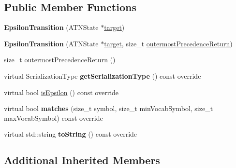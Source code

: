 \subsection*{Public Member Functions}
\begin{DoxyCompactItemize}
\item 
\mbox{\label{classantlr4_1_1atn_1_1EpsilonTransition_af9acaefc6f86484a05ffe9f6ffc38ae9}} 
{\bfseries Epsilon\+Transition} (A\+T\+N\+State $\ast$\hyperlink{classantlr4_1_1atn_1_1Transition_aaaed7f4ddda71e156b36de33e88f66a7}{target})
\item 
\mbox{\label{classantlr4_1_1atn_1_1EpsilonTransition_a89f91655dacff645efa57b23c940bb71}} 
{\bfseries Epsilon\+Transition} (A\+T\+N\+State $\ast$\hyperlink{classantlr4_1_1atn_1_1Transition_aaaed7f4ddda71e156b36de33e88f66a7}{target}, size\+\_\+t \hyperlink{classantlr4_1_1atn_1_1EpsilonTransition_adb67e8063ffad68fe759b105547f38c7}{outermost\+Precedence\+Return})
\item 
size\+\_\+t \hyperlink{classantlr4_1_1atn_1_1EpsilonTransition_adb67e8063ffad68fe759b105547f38c7}{outermost\+Precedence\+Return} ()
\item 
\mbox{\label{classantlr4_1_1atn_1_1EpsilonTransition_a7a38bb719f9384e33ddb4414795de299}} 
virtual Serialization\+Type {\bfseries get\+Serialization\+Type} () const override
\item 
virtual bool \hyperlink{classantlr4_1_1atn_1_1EpsilonTransition_aa2ed63d1d7605293c69cd812c6e374ec}{is\+Epsilon} () const override
\item 
\mbox{\label{classantlr4_1_1atn_1_1EpsilonTransition_a3b259559117c7bd3de00af88f58ca4ba}} 
virtual bool {\bfseries matches} (size\+\_\+t symbol, size\+\_\+t min\+Vocab\+Symbol, size\+\_\+t max\+Vocab\+Symbol) const override
\item 
\mbox{\label{classantlr4_1_1atn_1_1EpsilonTransition_ad93842a60a917fe5dc199c390a2a2c0c}} 
virtual std\+::string {\bfseries to\+String} () const override
\end{DoxyCompactItemize}
\subsection*{Additional Inherited Members}


